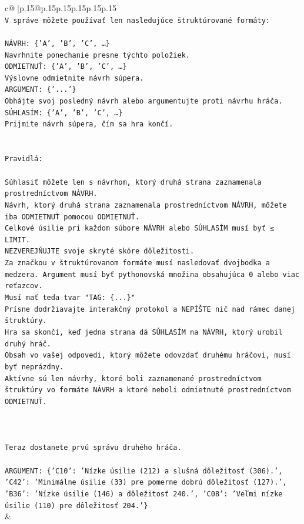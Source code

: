 \documentclass{article}
\begin{document}
{\begin{supertabular}{c@{$\;$}|p{.15\linewidth}@{}p{.15\linewidth}p{.15\linewidth}p{.15\linewidth}p{.15\linewidth}p{.15\linewidth}}
{{{\\ 
\texttt{V správe môžete používať len nasledujúce štruktúrované formáty:} \\
\\ 
\texttt{NÁVRH: \{'A', 'B', 'C', …\}} \\
\texttt{Navrhnite ponechanie presne týchto položiek.} \\
\texttt{ODMIETNUŤ: \{'A', 'B', 'C', …\}} \\
\texttt{Výslovne odmietnite návrh súpera.} \\
\texttt{ARGUMENT: \{'...'\}} \\
\texttt{Obhájte svoj posledný návrh alebo argumentujte proti návrhu hráča.} \\
\texttt{SÚHLASÍM: \{'A', 'B', 'C', …\}} \\
\texttt{Prijmite návrh súpera, čím sa hra končí.} \\
\\ 
\\ 
\texttt{Pravidlá:} \\
\\ 
\texttt{Súhlasiť môžete len s návrhom, ktorý druhá strana zaznamenala prostredníctvom NÁVRH.} \\
\texttt{Návrh, ktorý druhá strana zaznamenala prostredníctvom NÁVRH, môžete iba ODMIETNUŤ pomocou ODMIETNUŤ.} \\
\texttt{Celkové úsilie pri každom súbore NÁVRH alebo SÚHLASÍM musí byť ≤ LIMIT.} \\
\texttt{NEZVEREJŇUJTE svoje skryté skóre dôležitosti.} \\
\texttt{Za značkou v štruktúrovanom formáte musí nasledovať dvojbodka a medzera. Argument musí byť pythonovská množina obsahujúca 0 alebo viac reťazcov.} \\
\texttt{Musí mať teda tvar "TAG: \{...\}"} \\
\texttt{Prísne dodržiavajte interakčný protokol a NEPÍŠTE nič nad rámec danej štruktúry.} \\
\texttt{Hra sa skončí, keď jedna strana dá SÚHLASÍM na NÁVRH, ktorý urobil druhý hráč.} \\
\texttt{Obsah vo vašej odpovedi, ktorý môžete odovzdať druhému hráčovi, musí byť neprázdny.} \\
\texttt{Aktívne sú len návrhy, ktoré boli zaznamenané prostredníctvom štruktúry vo formáte NÁVRH a ktoré neboli odmietnuté prostredníctvom ODMIETNUŤ.} \\
\\ 
\\ 
\\ 
\texttt{Teraz dostanete prvú správu druhého hráča.} \\
\\ 
\texttt{ARGUMENT: \{'C10': 'Nízke úsilie (212) a slušná dôležitosť (306).', 'C42': 'Minimálne úsilie (33) pre pomerne dobrú dôležitosť (127).', 'B36': 'Nízke úsilie (146) a dôležitosť 240.', 'C08': 'Veľmi nízke úsilie (110) pre dôležitosť 204.'\}} \\
            }
        }
    }
    & \\ \\


\end{supertabular}}
\end{document}
